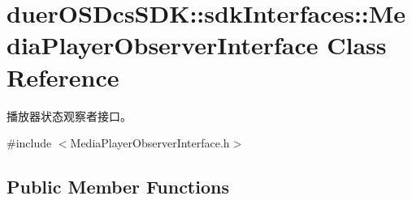 \hypertarget{classduerOSDcsSDK_1_1sdkInterfaces_1_1MediaPlayerObserverInterface}{}\section{duer\+O\+S\+Dcs\+S\+DK\+:\+:sdk\+Interfaces\+:\+:Media\+Player\+Observer\+Interface Class Reference}
\label{classduerOSDcsSDK_1_1sdkInterfaces_1_1MediaPlayerObserverInterface}


播放器状态观察者接口。  




{\ttfamily \#include $<$Media\+Player\+Observer\+Interface.\+h$>$}

\subsection*{Public Member Functions}
